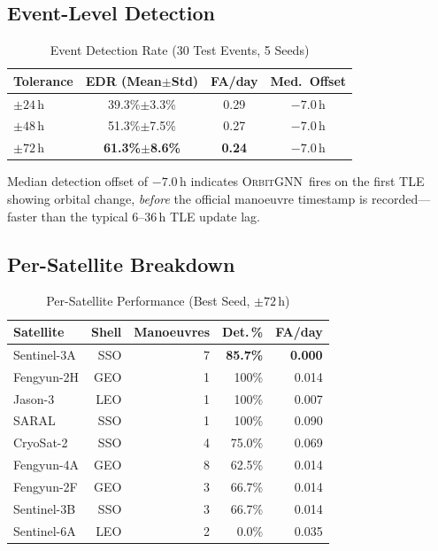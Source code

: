 \documentclass[journal]{IEEEtran}
\newcommand{\orbitgnn}{\textsc{OrbitGNN}}
\begin{document}
\subsection{Event-Level Detection}

\begin{table}[h]
\centering\caption{Event Detection Rate (30 Test Events, 5 Seeds)}
\label{tab:events}
\begin{tabular}{@{}lccc@{}}
\toprule
Tolerance & EDR (Mean$\pm$Std) & FA/day & Med.\ Offset \\
\midrule
$\pm24$\,h & 39.3\%$\pm$3.3\% & 0.29 & $-7.0$\,h \\
$\pm48$\,h & 51.3\%$\pm$7.5\% & 0.27 & $-7.0$\,h \\
$\pm72$\,h & \textbf{61.3\%$\pm$8.6\%} & \textbf{0.24} & $-7.0$\,h \\
\bottomrule
\end{tabular}
\end{table}

Median detection offset of $-7.0$\,h indicates \orbitgnn\ fires on the
first TLE showing orbital change, \emph{before} the official manoeuvre
timestamp is recorded---faster than the typical 6--36\,h TLE update lag.

\subsection{Per-Satellite Breakdown}

\begin{table}[h]
\centering\caption{Per-Satellite Performance (Best Seed, $\pm72$\,h)}
\label{tab:persat}
\setlength\tabcolsep{4pt}
\begin{tabular}{@{}lrrrr@{}}
\toprule
Satellite & Shell & Manoeuvres & Det.\,\% & FA/day \\
\midrule
Sentinel-3A & SSO & 7 & \textbf{85.7\%} & \textbf{0.000} \\
Fengyun-2H  & GEO & 1 & 100\% & 0.014 \\
Jason-3     & LEO & 1 & 100\% & 0.007 \\
SARAL       & SSO & 1 & 100\% & 0.090 \\
CryoSat-2   & SSO & 4 & 75.0\% & 0.069 \\
Fengyun-4A  & GEO & 8 & 62.5\% & 0.014 \\
Fengyun-2F  & GEO & 3 & 66.7\% & 0.014 \\
Sentinel-3B & SSO & 3 & 66.7\% & 0.014 \\
Sentinel-6A & LEO & 2 & 0.0\%  & 0.035 \\
\bottomrule
\end{tabular}
\end{table}
\end{document}
